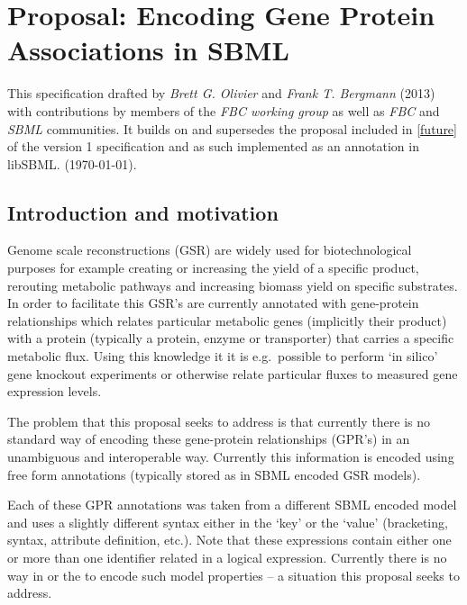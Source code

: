 
\section{Proposal: Encoding Gene Protein Associations in SBML}
\label{apdx-gene_association}

This specification drafted by \emph{Brett G. Olivier} and \emph{Frank T. Bergmann} (2013) with contributions by members of the \emph{FBC working group} as well as \emph{FBC} and \emph{SBML} communities. It builds on and supersedes the proposal included in \ref{future} of the \FBCPackage version 1 specification and as such implemented as an annotation in \textsf{libSBML}. (\today).

\subsection{ Introduction and motivation }
\label{intro-ga}

Genome scale reconstructions (GSR) are widely used for biotechnological purposes for example creating or increasing the yield of a specific product, rerouting metabolic pathways and increasing biomass yield on specific substrates. In order to facilitate this GSR's are currently annotated with gene-protein relationships which relates particular metabolic genes (implicitly their product) with a protein (typically a protein, enzyme or transporter) that carries a specific metabolic flux. Using this knowledge it it is e.g.~possible to perform `in silico' gene knockout experiments or otherwise relate particular fluxes to measured gene expression levels.

The problem that this proposal seeks to address is that currently there is no standard way of encoding these gene-protein relationships (GPR's) in an unambiguous and interoperable way. Currently this information is encoded using free form annotations (typically stored as \Notes in SBML encoded GSR models).
%

Each of these GPR annotations was taken from a different SBML encoded model and uses a slightly different syntax either in the `key' or the `value' (bracketing, syntax, attribute definition, etc.). Note that these expressions contain either one or more than one identifier related in a logical expression. Currently there is no way in \sbmlthreecore or the \FBCPackage to encode such model properties -- a situation this proposal seeks to address.

